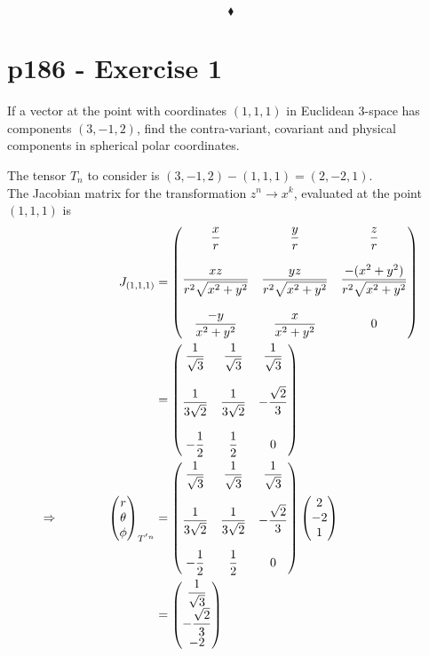 $$\blacklozenge$$
\newpage

\section{p186 - Exercise 1}
\begin{tcolorbox}
If a vector at the point with coordinates $\left(1,1,1\right)$ in Euclidean $3$-space has components $\left(3,-1,2\right)$, find the contra-variant, covariant and physical components in spherical polar coordinates.
\end{tcolorbox}
The tensor $T_n$ to consider is $\left(3,-1,2\right) - \left(1,1,1\right)= \left(2,-2,1\right)$.\\
The Jacobian matrix for the transformation $z^n \rightarrow x^k$, evaluated at the point $\left(1,1,1\right)$ is 
\begin{align}
J_{\left(1,1,1\right)}&={\begin{pmatrix}{\dfrac {x}{r}}&{\dfrac {y}{r}}&{\dfrac {z}{r}}\\\\{\dfrac {xz}{r^{2}{\sqrt {x^{2}+y^{2}}}}}&{\dfrac {yz}{r^{2}{\sqrt {x^{2}+y^{2}}}}}&{\dfrac {-(x^{2}+y^{2})}{r^{2}{\sqrt {x^{2}+y^{2}}}}}\\\\{\dfrac {-y}{x^{2}+y^{2}}}&{\dfrac {x}{x^{2}+y^{2}}}&0\end{pmatrix}}\\
&=\begin{pmatrix}\dfrac {1}{\sqrt{3}}&\dfrac {1}{\sqrt{3}}&\dfrac {1}{\sqrt{3}}\\\\ \dfrac {1}{3\sqrt{2}}& \dfrac {1}{3\sqrt{2}}&-\dfrac {\sqrt{2}}{3}\\\\ -\dfrac {1}{2}&\dfrac {1}{2}&0\end{pmatrix}\\
\Rightarrow \quad\quad\quad\quad 
\begin{pmatrix}
r\\
\theta\\
\phi
\end{pmatrix}_{T^{'n}}&=\begin{pmatrix}\dfrac {1}{\sqrt{3}}&\dfrac {1}{\sqrt{3}}&\dfrac {1}{\sqrt{3}}\\\\ \dfrac {1}{3\sqrt{2}}& \dfrac {1}{3\sqrt{2}}&-\dfrac {\sqrt{2}}{3}\\\\ -\dfrac {1}{2}&\dfrac {1}{2}&0\end{pmatrix}\begin{pmatrix}
2\\
-2\\
1
\end{pmatrix}\\
&=\begin{pmatrix}
\dfrac {1}{\sqrt{3}}\\
-\dfrac {\sqrt{2}}{3}\\
-2
\end{pmatrix}
\end{align}
